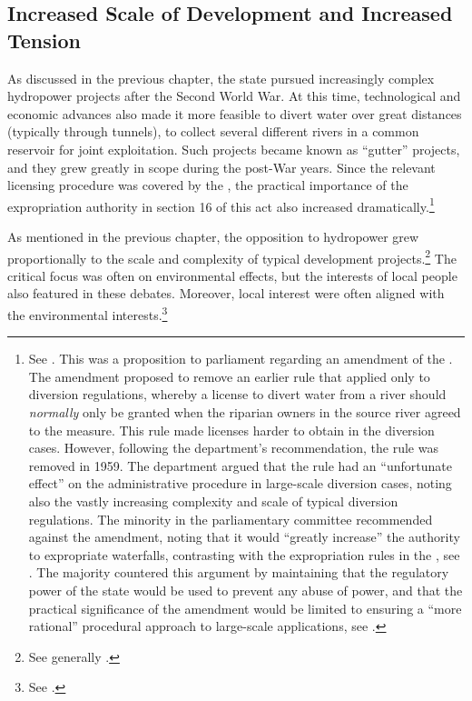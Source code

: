 \subsection{Increased Scale of Development and Increased Tension}

As discussed in the previous chapter, the state pursued increasingly complex hydropower projects after the Second World War. At this time, technological and economic advances also made it more feasible to divert water over great distances (typically through tunnels), to collect several different rivers in a common reservoir for joint exploitation. Such projects became known as ``gutter'' projects, and they grew greatly in scope during the post-War years. Since the relevant licensing procedure was covered by the \cite{wra17}, the practical importance of the expropriation authority in section 16 of this act also increased dramatically.\footnote{See \cite[11]{innst59}. This was a proposition to parliament regarding an amendment of the \cite{wra17}. The amendment proposed to remove an earlier rule that applied only to diversion regulations, whereby a license to divert water from a river should {\it normally} only be granted when the riparian owners in the source river agreed to the measure. This rule made licenses harder to obtain in the diversion cases. However, following the department's recommendation, the rule was removed in 1959. The department argued that the rule had an ``unfortunate effect'' on the administrative procedure in large-scale diversion cases, noting also the vastly increasing complexity and scale of typical diversion regulations. The minority in the parliamentary committee recommended against the amendment, noting that it would ``greatly increase'' the authority to expropriate waterfalls, contrasting with the expropriation rules in the \cite{wra40}, see \cite[14]{innst59}. The majority countered this argument by maintaining that the regulatory power of the state would be used to prevent any abuse of power, and that the practical significance of the amendment would be limited to ensuring a ``more rational'' procedural approach to large-scale applications, see \cite[14]{innst59}.}

As mentioned in the previous chapter, the opposition to hydropower grew proportionally to the scale and complexity of typical development projects.\footnote{See generally \cite[64-65]{nilsen08}.} The critical focus was often on environmental effects, but the interests of local people also featured in these debates. Moreover, local interest were often aligned with the environmental interests.\footnote{See \cite[72-73]{nilsen08}.} %

